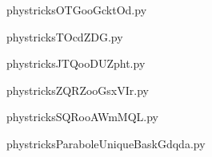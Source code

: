     \newcommand{\CaptionFigOTGooGcktOd}{<+Type your caption here+>}
    \begin{center}
        
    \end{center}
    phystricksOTGooGcktOd.py

    

    \clearpage
    


    \newcommand{\CaptionFigTOcdZDG}{<+Type your caption here+>}
    \begin{center}
        
    \end{center}
    phystricksTOcdZDG.py

    

    \clearpage
    


    \newcommand{\CaptionFigJTQooDUZpht}{<+Type your caption here+>}
    \begin{center}
        
    \end{center}
    phystricksJTQooDUZpht.py

    

    \clearpage
    


    \newcommand{\CaptionFigZQRZooGsxVIr}{<+Type your caption here+>}
    \begin{center}
        
    \end{center}
    phystricksZQRZooGsxVIr.py

    

    \clearpage
    


    \newcommand{\CaptionFigSQRooAWmMQL}{<+Type your caption here+>}
    \begin{center}
        
    \end{center}
    phystricksSQRooAWmMQL.py

    

    \clearpage
    


    \newcommand{\CaptionFigParaboleUniqueBaskGdqda}{<+Type your caption here+>}
    \begin{center}
        
    \end{center}
    phystricksParaboleUniqueBaskGdqda.py

